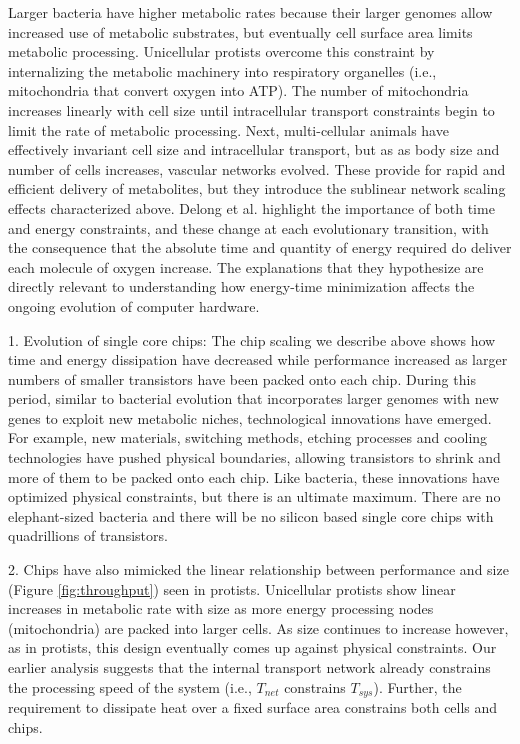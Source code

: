 \documentclass[12pt]{article}
\begin{document}
Larger bacteria have higher metabolic rates because their larger genomes allow increased use of
metabolic substrates, but eventually cell surface area limits metabolic
processing. Unicellular protists overcome this constraint by internalizing the metabolic machinery into
respiratory organelles (i.e., mitochondria that convert oxygen into ATP). The
number of mitochondria increases linearly with cell size until intracellular
transport constraints begin to limit the rate of metabolic processing.
Next, multi-cellular
animals have effectively invariant cell size and intracellular transport, but as as body size and number of cells increases, vascular networks evolved. These provide for rapid and efficient delivery of metabolites, but they introduce the sublinear network scaling effects characterized above. Delong et al. highlight the
importance of both time and energy constraints, and these change at each evolutionary transition, with the consequence that the absolute time and quantity of
energy required do deliver each molecule of oxygen increase.  The explanations that they hypothesize are directly relevant
to understanding how energy-time minimization affects the ongoing evolution of
computer hardware.

1.     Evolution of single core chips: The chip scaling we describe above shows
how time and energy dissipation have decreased while performance increased as
larger numbers of smaller transistors have been packed onto each chip. During
this period, similar to bacterial evolution that incorporates larger genomes with new genes to
exploit new metabolic niches, technological innovations have emerged. For
example, new materials, switching methods, etching processes and cooling
technologies have pushed physical boundaries, allowing transistors to shrink
and more of them to be packed onto each chip. Like bacteria, these innovations
have optimized physical constraints, but there is an ultimate maximum. There
are no elephant-sized bacteria and there will be no silicon based single core
chips with quadrillions of transistors.

2.  Chips have also mimicked the linear relationship between performance and
size (Figure \ref{fig:throughput}) seen in protists. Unicellular protists show linear increases
in metabolic rate with size as more energy processing nodes  (mitochondria) are
packed into larger cells. As size continues to increase however, as in protists, this design eventually comes up against physical constraints.  Our earlier analysis suggests that the
internal transport network already constrains the processing speed of the
system (i.e., $T_{net}$ constrains $T_{sys}$). Further, the requirement to
dissipate heat over a fixed surface area constrains both cells and chips. 
\end{document}
